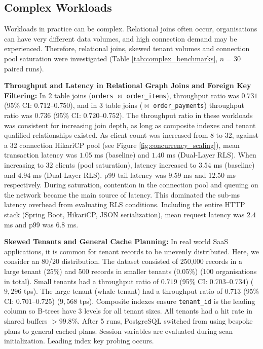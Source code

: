 \documentclass[conference]{IEEEtran}
\begin{document}
\subsection{Complex Workloads}
Workloads in practice can be complex. Relational joins often occur, organisations can have very different data volumes, and high connection demand may be experienced. Therefore, relational joins, skewed tenant volumes and connection pool saturation were investigated (Table \ref{tab:complex_benchmarks}, $n=30$ paired runs).

\textbf{Throughput and Latency in Relational Graph Joins and Foreign Key Filtering:} In 2 table joins (\texttt{orders} $\bowtie$ \texttt{order\_items}), throughput ratio was $0.731$ (95\% CI: $0.712$--$0.750$), and in 3 table joins ($\bowtie$ \texttt{order\_payments}) throughput ratio was $0.736$ (95\% CI: $0.720$--$0.752$). The throughput ratio in these workloads was consistent for increasing join depth, as long as composite indexes and tenant qualified relationships existed. As client count was increased from 8 to 32, against a 32 connection HikariCP pool (see Figure \ref{fig:concurrency_scaling}), mean transaction latency was $1.05$ ms (baseline) and $1.40$ ms (Dual-Layer RLS). When increasing to 32 clients (pool saturation), latency increased to $3.54$ ms (baseline) and $4.94$ ms (Dual-Layer RLS). p99 tail latency was $9.59$ ms and $12.50$ ms respectively. During saturation, contention in the connection pool and queuing on the network became the main source of latency. This dominated the sub-ms latency overhead from evaluating RLS conditions. Including the entire HTTP stack (Spring Boot, HikariCP, JSON serialization), mean request latency was $2.4$ ms and p99 was $6.8$ ms.

\textbf{Skewed Tenants and General Cache Planning:} In real world SaaS applications, it is common for tenant records to be unevenly distributed. Here, we consider an 80/20 distribution. The dataset consisted of 250,000 records in a large tenant (25\%) and 500 records in smaller tenants (0.05\%) (100 organisations in total). Small tenants had a throughput ratio of $0.719$ (95\% CI: $0.703$--$0.734$) ($9,296$ tps). The large tenant (whale tenant) had a throughput ratio of $0.713$ (95\% CI: $0.701$--$0.725$) ($9,568$ tps). Composite indexes ensure \texttt{tenant\_id} is the leading column so B-trees have 3 levels for all tenant sizes. All tenants had a hit rate in shared buffers $> 99.8\%$. After 5 runs, PostgreSQL switched from using bespoke plans to general cached plans. Session variables are evaluated during scan initialization. Leading index key probing occurs.
\end{document}
